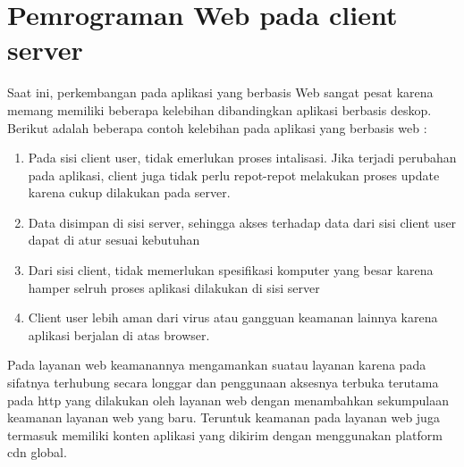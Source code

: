 \section {Pemrograman Web pada client server}
Saat ini, perkembangan pada aplikasi yang berbasis Web sangat pesat karena memang memiliki beberapa kelebihan dibandingkan aplikasi berbasis deskop. Berikut adalah beberapa contoh kelebihan pada aplikasi yang berbasis web :

\begin{enumerate}
    \item Pada sisi client user, tidak emerlukan proses intalisasi. Jika terjadi perubahan pada aplikasi, client juga tidak perlu repot-repot melakukan proses update karena cukup dilakukan  pada server.
    \item Data disimpan di sisi server, sehingga akses terhadap data dari sisi client user dapat di atur sesuai kebutuhan
    \item Dari sisi client, tidak memerlukan spesifikasi komputer yang besar karena hamper selruh proses aplikasi dilakukan di sisi server
    \item Client user lebih aman dari virus atau gangguan keamanan lainnya karena aplikasi berjalan di atas browser.
\end{enumerate}

Pada layanan web keamanannya mengamankan suatau layanan karena pada sifatnya terhubung secara longgar dan penggunaan aksesnya terbuka terutama pada http yang
 dilakukan oleh layanan web dengan menambahkan sekumpulaan keamanan layanan web yang baru. Teruntuk keamanan pada layanan web juga termasuk memiliki konten aplikasi yang dikirim dengan menggunakan platform cdn global. 




    
